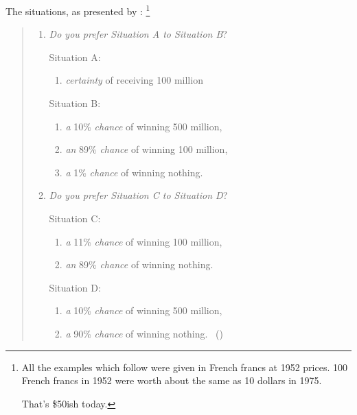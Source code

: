 \begin{note}
  The situations, as presented by \citeauthor{Allais:1979aa}:%
  \footnote{
    All the examples which follow were given in French francs at 1952 prices. 100 French francs in 1952 were worth about the same as 10 dollars in 1975.

    \citeauthor[138, fn.94]{Allais:1979aa}

    That's \$50ish today.
  }
  \begin{quote}
    \begin{enumerate}[label=(\arabic*), ref=(\arabic*)]
    \item
      \emph{Do you prefer Situation A to Situation B}?

      Situation A:
        \begin{enumerate}[label=--]
        \item
          \emph{certainty} of receiving 100 million
        \end{enumerate}
        Situation B:
        \begin{enumerate}[label=--]
        \item
          \emph{a} 10\% \emph{chance} of winning 500 million,
        \item
          \emph{an} 89\% \emph{chance} of winning 100 million,
        \item
          \emph{a} 1\% \emph{chance} of winning nothing.
        \end{enumerate}
      \item
      \emph{Do you prefer Situation C to Situation D}?

      Situation C:
        \begin{enumerate}[label=--]
        \item
          \emph{a} 11\% \emph{chance} of winning 100 million,
        \item
          \emph{an} 89\% \emph{chance} of winning nothing.
        \end{enumerate}
        Situation D:
        \begin{enumerate}[label=--]
        \item
          \emph{a} 10\% \emph{chance} of winning 500 million,
        \item
          \emph{a} 90\% \emph{chance} of winning nothing.%
          \mbox{ }\hfill\mbox{(\citeyear[89]{Allais:1979aa})}
        \end{enumerate}
    \end{enumerate}
  \end{quote}


\end{note}
